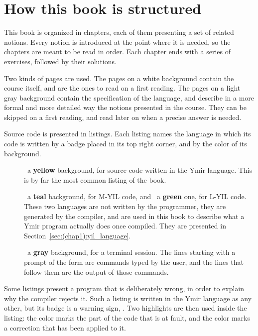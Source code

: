 \section{How this book is structured}
\label{sec:(chap1):structure}

This book is organized in chapters, each of them presenting a set of related
notions. Every notion is introduced at the point where it is needed, so the
chapters are meant to be read in order. Each chapter ends with a series of
exercises, followed by their solutions.

Two kinds of pages are used. The pages on a white background contain the course
itself, and are the ones to read on a first reading. The pages on a light gray
background contain the specification of the language, and describe in a more
formal and more detailed way the notions presented in the course. They can be
skipped on a first reading, and read later on when a precise answer is needed.

Source code is presented in listings. Each listing names the language in which
its code is written by a badge placed in its top right corner, and by the color
of its background.

\begin{description}
\item[\ymirbadgeymir] ~a
  \textbf{yellow} background, for source code written in the Ymir language. This
  is by far the most common listing of the book.
\item[\ymirbadgemyil] ~a
  \textbf{teal} background, for M-YIL code, and
  ~a \textbf{green} one, for L-YIL
  code. These two languages are not written by the programmer, they are
  generated by the compiler, and are used in this book to describe what a Ymir
  program actually does once compiled. They are presented in
  Section~\ref{sec:(chap1):yil_language}.
\item[\ymirbadgeshell] ~a
  \textbf{gray} background, for a terminal session. The lines starting with a
  prompt of the form  are commands typed
  by the user, and the lines that follow them are the output of those commands.
\end{description}

Some listings present a program that is deliberately wrong, in order to explain
why the compiler rejects it. Such a listing is written in the Ymir language as
any other, but its badge is a warning sign, \ymirbadgeerror. Two
highlights are then used inside the listing: the color  marks the part
of the code that is at fault, and the color  marks a correction that
has been applied to it.

\vfill%
\pagebreak%
